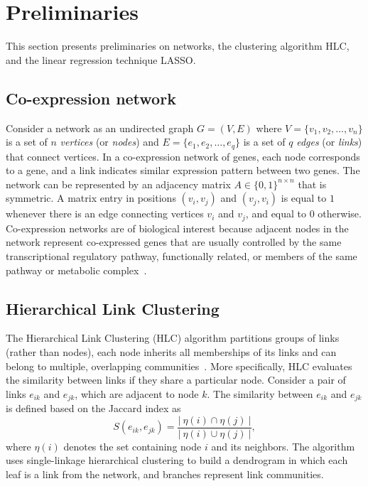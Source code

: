 \section*{Preliminaries}
\label{sec.prelim}

This section presents preliminaries on networks, the clustering algorithm HLC,
and the linear regression technique LASSO.

\subsection*{Co-expression network}

Consider a network as an undirected graph $G=(V,E)$ where
${V=\{v_1,v_2,\ldots,v_{n}\}}$ is a set of $n$ \textit{vertices} (or
\textit{nodes}) and ${E=\{e_1,e_2,\ldots,e_q\}}$ is a set of $q$
\textit{edges} (or \textit{links}) that connect vertices. In a
co-expression network of genes, each node corresponds to a gene, and
a link indicates similar expression pattern between two genes.
The network can be represented by an adjacency matrix $A
\in \{0,1\}^{n \times n}$ that is symmetric. A matrix entry in 
positions $(v_i,v_j)$ and $(v_j,v_i)$ is equal to $1$ whenever there is an edge
connecting vertices $v_i$ and $v_j$, and equal to $0$
otherwise. Co-expression networks are of biological interest because
adjacent nodes in the network represent co-expressed genes that are
usually controlled by the same transcriptional regulatory pathway,
functionally related, or members of the same pathway or metabolic
complex~\cite{FIONDA2019915}.


\subsection*{Hierarchical Link Clustering}

The Hierarchical Link Clustering (HLC) algorithm partitions
groups of links (rather than nodes), each node inherits all
memberships of its links and can belong to multiple, overlapping
communities~\cite{ahn2010link}. More specifically, HLC evaluates the similarity 
between links if they share a particular node.
Consider a pair of links $e_{ik}$ and $e_{jk}$, which are adjacent to node $k$.
The similarity between $e_{ik}$ and $e_{jk}$ is defined based on the Jaccard index as
%
\begin{equation}\label{eq:jaccard}
  S(e_{ik},e_{jk}) = \frac{\vert \ \eta(i) \cap \eta(j) \ \vert}{\vert \ \eta(i) \cup \eta(j) \ \vert},
\end{equation}
%
where $\eta(i)$ denotes the set containing node $i$ and its
neighbors. The algorithm uses single-linkage hierarchical clustering
to build a dendrogram in which each leaf is a link from the
network, and branches represent link communities. 
\vspace{0.5cm}

